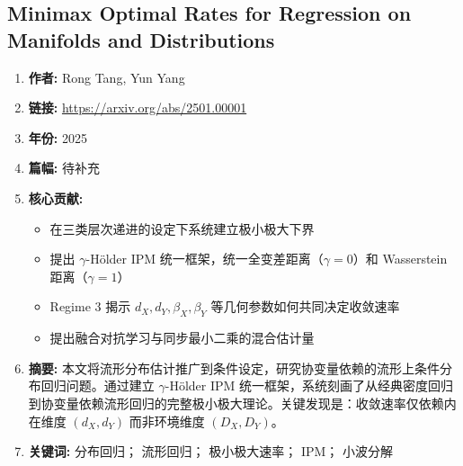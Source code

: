 \subsection{Minimax Optimal Rates for Regression on Manifolds and Distributions}
\begin{enumerate}
    \item \textbf{作者:} Rong Tang, Yun Yang
    \item \textbf{链接:} \url{https://arxiv.org/abs/2501.00001}
    \item \textbf{年份:} 2025
    \item \textbf{篇幅:} 待补充
    \item \textbf{核心贡献:}
        \begin{itemize}
            \item 在三类层次递进的设定下系统建立极小极大下界
            \item 提出 $\gamma$-Hölder IPM 统一框架，统一全变差距离（$\gamma=0$）和 Wasserstein 距离（$\gamma=1$）
            \item Regime 3 揭示 $d_X, d_Y, \beta_X, \beta_Y$ 等几何参数如何共同决定收敛速率
            \item 提出融合对抗学习与同步最小二乘的混合估计量
        \end{itemize}
    \item \textbf{摘要:} 本文将流形分布估计推广到条件设定，研究协变量依赖的流形上条件分布回归问题。通过建立 $\gamma$-Hölder IPM 统一框架，系统刻画了从经典密度回归到协变量依赖流形回归的完整极小极大理论。关键发现是：收敛速率仅依赖内在维度 $(d_X, d_Y)$ 而非环境维度 $(D_X, D_Y)$。
    \item \textbf{关键词:} 分布回归； 流形回归； 极小极大速率； IPM； 小波分解
\end{enumerate}

